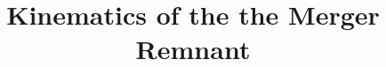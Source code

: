 \documentclass[twocolumn,linenumbers,trackchanges]{aastex7}
\begin{document}
\title{Kinematics of the the Merger Remnant}

\end{document}
